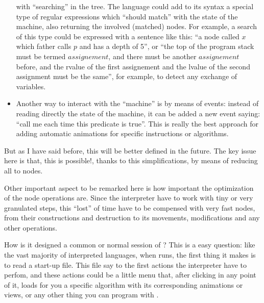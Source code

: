 \documentclass{article}
\begin{document}
\begin{itemize}
  with ``searching'' in the tree. The language could add to its syntax a special
  type of regular expressions which ``should match'' with the state of the
  machine, also returning the involved (matched) nodes. For example, a search of
  this type could be expressed with a sentence like this: ``a node called $x$
  which father calls $p$ and has a depth of 5'', or ``the top of the program
  stack must be termed $assignement$, and there must be another $assignement$
  before, and the rvalue of the first assignement and the lvalue of the second
  assignment must be the same'', for example, to detect any exchange of
  variables.
\item Another way to interact with the ``machine'' is by means of events:
  instead of reading directly the state of the machine, it can be added a new
  event saying: ``call me each time this predicate is true''. This is really the
  best approach for adding automatic animations for specific instructions or
  algorithms.
\end{itemize}

But as I have said before, this will be better defined in the future. The key
issue here is that, this is possible!, thanks to this simplifications, by means
of reducing all to nodes.

Other important aspect to be remarked here is how important the optimization of
the node operations are. Since the interpreter have to work with tiny or very
granulated steps, this ``lost'' of time have to be compensed with very fast
nodes, from their constructions and destruction to its movements, modifications
and any other operations.

How is it designed a common or normal session of \fav? This is a easy question:
like the vast majority of interpreted languages, when \fav runs, the first thing
it makes is to read a start-up file. This file say to \fav the first actions the
interpreter have to perfom, and these actions could be a little menu that, after
clicking in any point of it, loads for you a specific algorithm with its
corresponding animations or views, or any other thing you can program with
\faupp.
\end{document}
